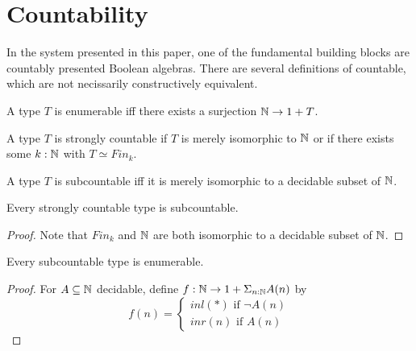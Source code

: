 \section{Countability}\label{CountabilityDiscussion}
In the system presented in this paper, 
one of the fundamental building blocks are countably presented Boolean algebras. 
There are several definitions of countable, which are not necissarily constructively equivalent. 

\begin{definition}
  A type $T$ is enumerable iff there exists a surjection $\mathbb{N} \to 1 + T$. 
\end{definition}
\begin{definition}
  A type $T$ is strongly countable if
  $T$ is merely isomorphic to $\mathbb{N}$ or if 
  there exists some $k:\mathbb{N}$ with $T \simeq Fin_k$.%
\end{definition}
\begin{definition}
  A type $T$ is subcountable iff it is merely isomorphic to a decidable subset of $\mathbb{N}$. 
\end{definition}

\begin{lemma}
  Every strongly countable type is subcountable. 
\end{lemma}
\begin{proof}
  Note that $Fin_k$ and $\mathbb{N}$ are both isomorphic to a decidable subset of $\mathbb{N}$. 
\end{proof}
\begin{lemma}
  Every subcountable type is enumerable. 
\end{lemma}
\begin{proof}
  For $A\subseteq \mathbb{N}$ decidable, define $f:\mathbb{N} \to 1 + \Sigma_{n:\mathbb{N}} A(n)$ by 
  $$
  f(n) = 
  \begin{cases}
    inl(*) \text{ if } \neg A(n)\\
    inr(n) \text{ if } A(n)
  \end{cases}
  $$
\end{proof} 



